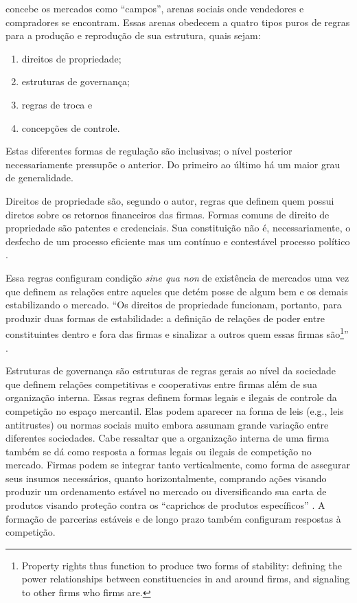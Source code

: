 \documentclass[a4paper, 12pt, openright, oneside, german, french, english, brazil]{abntex2}
\begin{document}
	 concebe os mercados como ``campos'', arenas sociais onde vendedores e compradores se encontram. Essas arenas obedecem a quatro tipos puros de regras para a produção e reprodução de sua estrutura, quais sejam:

	\begin{enumerate}
		\item direitos de propriedade;
		\item estruturas de governança;
		\item regras de troca e
		\item concepções de controle.
	\end{enumerate}

	Estas diferentes formas de regulação são inclusivas; o nível posterior necessariamente pressupõe o anterior. Do primeiro ao último há um maior grau de generalidade.

	Direitos de propriedade são, segundo o autor, regras que definem quem possui diretos sobre os retornos financeiros das firmas. Formas comuns de direito de propriedade são patentes e credenciais. Sua constituição não é, necessariamente, o desfecho de um processo eficiente mas um contínuo e contestável processo político \cite{fligstein2002architecture}.

	Essa regras configuram condição \textit{sine qua non} de existência de mercados uma vez que definem as relações entre aqueles que detém posse de algum bem e os demais estabilizando o mercado. ``Os direitos de propriedade funcionam, portanto, para produzir duas formas de estabilidade: a definição de relações de poder entre constituintes dentro e fora das firmas e sinalizar a outros quem essas firmas são\footnote{Property rights thus function to produce two forms of stability: defining the power relationships between constituencies in and around firms, and signaling to other firms who firms are.}'' \cite[p. 34]{fligstein2002architecture}.

	Estruturas de governança são estruturas de regras gerais ao nível da sociedade que definem relações competitivas e cooperativas entre firmas além de sua organização interna. Essas regras definem formas legais e ilegais de controle da competição no espaço mercantil. Elas podem aparecer na forma de leis (e.g., leis antitrustes) ou normas sociais muito embora assumam grande variação entre diferentes sociedades. Cabe ressaltar que a organização interna de uma firma também se dá como resposta a formas legais ou ilegais de competição no mercado. Firmas podem se integrar tanto verticalmente, como forma de assegurar seus insumos necessários, quanto horizontalmente, comprando ações visando produzir um ordenamento estável no mercado ou diversificando sua carta de produtos visando proteção contra os ``caprichos de produtos específicos'' \cite[p. 34]{fligstein2002architecture}. A formação de parcerias estáveis e de longo prazo também configuram respostas à competição.
\end{document}
